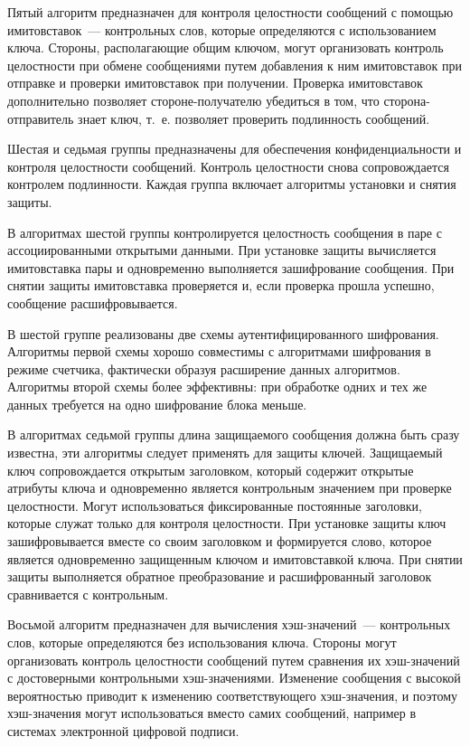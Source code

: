 Пятый алгоритм предназначен для контроля целостности сообщений
с помощью имитовставок~--- контрольных слов, 
которые определяются с использованием ключа.
%
Стороны, располагающие общим ключом, 
могут организовать контроль целостности при обмене сообщениями
путем добавления к ним имитовставок при отправке 
и проверки имитовставок при получении.
%
Проверка имитовставок дополнительно позволяет стороне-получателю 
убедиться в том, что сторона-отправитель знает ключ,
т.~е. позволяет проверить подлинность сообщений.

Шестая и седьмая группы предназначены для обеспечения конфиденциальности 
и контроля целостности сообщений. 
%
Контроль целостности снова сопровождается контролем подлинности.
%
Каждая группа включает алгоритмы установки и снятия защиты. 

В алгоритмах шестой группы контролируется целостность сообщения в паре с 
ассоциированными открытыми данными. 
%
При установке защиты вычисляется имитовставка пары и одновременно 
выполняется зашифрование сообщения. 
%
При снятии защиты имитовставка проверяется и,
если проверка прошла успешно, сообщение расшифровывается.

В шестой группе реализованы две схемы аутентифицированного шифрования.
%
Алгоритмы первой схемы хорошо совместимы с алгоритмами шифрования в режиме счетчика, 
фактически образуя расширение данных алгоритмов.
%
Алгоритмы второй схемы более эффективны: при обработке одних и тех же данных  
требуется на одно шифрование блока меньше.

В алгоритмах седьмой группы длина защищаемого сообщения должна быть сразу известна,
эти алгоритмы следует применять для защиты ключей.
Защищаемый ключ сопровождается открытым заголовком, 
который содержит открытые атрибуты ключа и одновременно
является контрольным значением при проверке целостности. 
%
Могут использоваться фиксированные постоянные заголовки, 
которые служат только для контроля целостности.
%
При установке защиты ключ зашифровывается вместе со своим заголовком
и формируется слово, которое является одновременно 
защищенным ключом и имитовставкой ключа.
%
При снятии защиты выполняется обратное преобразование
и расшифрованный заголовок сравнивается с контрольным.

Восьмой алгоритм предназначен для вычисления
хэш-значений~--- контрольных слов, 
которые определяются без использования ключа.
%
Стороны могут организовать контроль целостности сообщений
путем сравнения их хэш-значений с достоверными контрольными хэш-значениями.
%
Изменение сообщения с высокой вероятностью
приводит к изменению соответствующего хэш-значения,
и поэтому хэш-значения могут использоваться вместо самих сообщений,
например в системах электронной цифровой подписи.

